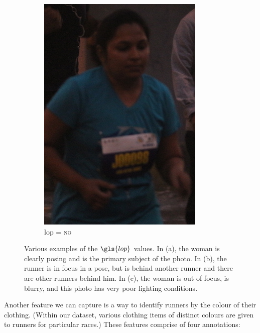\begin{figure}[p]
\begin{subfigure}[b]{0.25\textwidth}
    \includegraphics[width=\textwidth]{images/dataset/Prominence_LoP_No}
    \caption{\gls{lop} = \textsc{no}}
  \end{subfigure}
  \hspace{\fill}
  \caption[Variant Purchase Likelihoods]{Various examples of the $\gls{lop}$ values. In (a), the woman is clearly posing and is the primary subject of the photo. In (b), the runner is in focus in a pose, but is behind another runner and there are other runners behind him. In (c), the woman is out of focus, is blurry, and this photo has very poor lighting conditions.}
  \label{fig:dataset:lop_prominence}
\end{figure}

Another feature we can capture is a way to identify runners by the colour of their clothing. (Within our dataset, various clothing items of distinct colours are given to runners for particular races.) These features comprise of four annotations:

